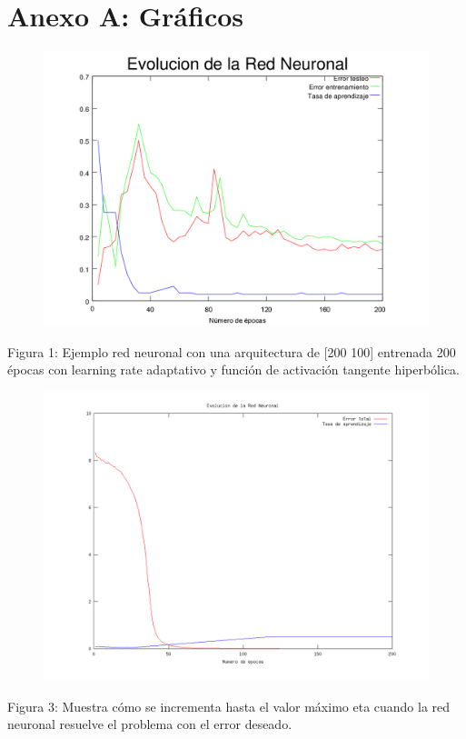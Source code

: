 \documentclass[%
    final,
    reprint,
    notitlepage,
    narroweqnarray,
    inline,
    twoside,
    invited
    ]{ieee}
\begin{document}


\clearpage
\onecolumn

\section*{Anexo A: Gráficos}

\begin{figure}[H]
\begin{center}
\includegraphics[scale=0.70]{./images/6.png}
\label{modelado}
\end{center}
\end{figure}

\begin{center}
\par Figura 1: Ejemplo red neuronal con una arquitectura de [200 100] entrenada 200 épocas con learning rate adaptativo y función de activación tangente hiperbólica.
\end{center}

\clearpage

\begin{figure}[H]
\begin{center}
\includegraphics[scale=0.30]{./images/incremento.png}
\label{modelado}
\end{center}
\end{figure}

\begin{center}
\par Figura 3: Muestra cómo se incrementa hasta el valor máximo eta cuando la red neuronal resuelve el problema con el error deseado.
\end{center}




\end{document}
